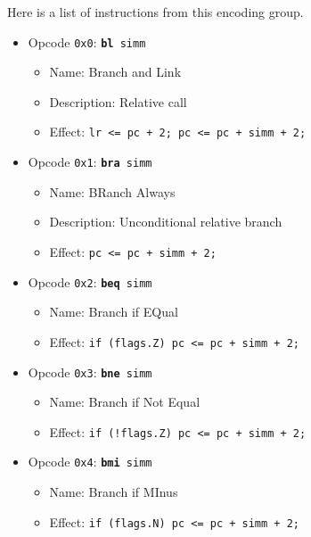 \documentclass{article}
\begin{document}
	Here is a list of instructions from this encoding group.

	\singlespacing
	\begin{itemize}
	\item Opcode \texttt{0x0}:
		\texttt{\textbf{bl} simm}
		\begin{itemize}
		\item Name: Branch and Link
		\item Description: Relative call
		\item Effect:
			\texttt{lr <= pc + 2; pc <= pc + simm + 2;}
		\end{itemize}

	\item Opcode \texttt{0x1}:
		\texttt{\textbf{bra} simm}
		\begin{itemize}
		\item Name: BRanch Always
		\item Description: Unconditional relative branch
		\item Effect:
			\texttt{pc <= pc + simm + 2;}
		\end{itemize}

	\item Opcode \texttt{0x2}:
		\texttt{\textbf{beq} simm}
		\begin{itemize}
		\item Name: Branch if EQual
		\item Effect:
			\texttt{if (flags.Z) pc <= pc + simm + 2;}
		\end{itemize}

	\item Opcode \texttt{0x3}:
		\texttt{\textbf{bne} simm}
		\begin{itemize}
		\item Name: Branch if Not Equal
		\item Effect:
			\texttt{if (!flags.Z) pc <= pc + simm + 2;}
		\end{itemize}

	\item Opcode \texttt{0x4}:
		\texttt{\textbf{bmi} simm}
		\begin{itemize}
		\item Name: Branch if MInus
		\item Effect:
			\texttt{if (flags.N) pc <= pc + simm + 2;}
		\end{itemize}


\end{itemize}
\end{document}
